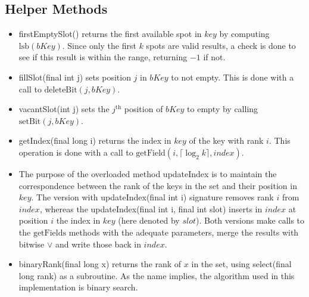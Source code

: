 \subsection{Helper Methods} \label{sec:binaryRankHelperMethods}
\begin{itemize}
    \item
    {\ttfamily firstEmptySlot()} returns the first available spot in $key$ by computing $\text{lsb}(bKey)$. Since only the first $k$ spots are valid results, a check is done to see if this result is within the range, returning $-1$ if not.
    
    \item
    {\ttfamily fillSlot(final int j)} sets position $j$ in $bKey$ to not empty. This is done with a call to $\text{deleteBit}(j, bKey)$.
    
    \item
    {\ttfamily vacantSlot(int j)} sets the $j^{\text{th}}$ position of $bKey$ to empty by calling $\text{setBit}(j, bKey)$.
    
    \item
    {\ttfamily getIndex(final long i)} returns the index in $key$ of the key with rank $i$. This operation is done with a call to $\text{getField}(i, \lceil \log_2 k\rceil, index)$.
    
    \item
    The purpose of the overloaded method {\ttfamily updateIndex} is to maintain the correspondence between the rank of the keys in the set and their position in $key$.
    The version with {\ttfamily updateIndex(final int i)} signature removes rank $i$ from $index$, whereas the {\ttfamily updateIndex(final int i, final int slot)} inserts in $index$ at position $i$ the index in $key$ (here denoted by $slot$). Both versions make calls to the $\text{getFields}$ methods with the adequate parameters, merge the results with bitwise $\vee$ and write those back in $index$.
    
    \item
    {\ttfamily binaryRank(final long x)} returns the rank of $x$ in the set, using {\ttfamily select(final long rank)} as a subroutine. As the name implies, the algorithm used in this implementation is binary search.
\end{itemize}

